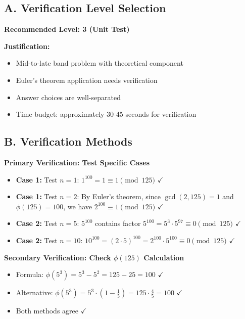 \documentclass[12pt]{article}
\begin{document}
\vspace{1em}

\begin{verificationbox}
\subsection*{A. Verification Level Selection}

\textbf{Recommended Level: 3 (Unit Test)}

\textbf{Justification:}
\begin{itemize}
    \item Mid-to-late band problem with theoretical component
    \item Euler's theorem application needs verification
    \item Answer choices are well-separated
    \item Time budget: approximately 30-45 seconds for verification
\end{itemize}

\subsection*{B. Verification Methods}

\textbf{Primary Verification: Test Specific Cases}
\begin{itemize}
    \item \textbf{Case 1:} Test $n = 1$: $1^{100} = 1 \equiv 1 \pmod{125}$ $\checkmark$
    \item \textbf{Case 1:} Test $n = 2$: By Euler's theorem, since $\gcd(2, 125) = 1$ and $\phi(125) = 100$, we have $2^{100} \equiv 1 \pmod{125}$ $\checkmark$
    \item \textbf{Case 2:} Test $n = 5$: $5^{100}$ contains factor $5^{100} = 5^3 \cdot 5^{97} \equiv 0 \pmod{125}$ $\checkmark$
    \item \textbf{Case 2:} Test $n = 10$: $10^{100} = (2 \cdot 5)^{100} = 2^{100} \cdot 5^{100} \equiv 0 \pmod{125}$ $\checkmark$
\end{itemize}

\textbf{Secondary Verification: Check $\phi(125)$ Calculation}
\begin{itemize}
    \item Formula: $\phi(5^3) = 5^3 - 5^2 = 125 - 25 = 100$ $\checkmark$
    \item Alternative: $\phi(5^3) = 5^3 \cdot (1 - \frac{1}{5}) = 125 \cdot \frac{4}{5} = 100$ $\checkmark$
    \item Both methods agree $\checkmark$
\end{itemize}


\end{verificationbox}
\end{document}
